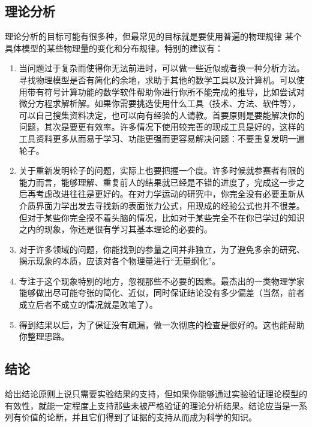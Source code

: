 \documentclass[a4paper,10pt,english]{sphinxmanual}
\begin{document}
\subsection{理论分析}
\label{\detokenize{6. Research:id8}}
理论分析的目标可能有很多种，但最常见的目标就是要使用普遍的物理规律  某个具体模型的某些物理量的变化和分布规律。特别的建议有：
\begin{enumerate}
\item {} 
当问题过于复杂而使得你无法前进时，可以做一些近似或者换一种分析方法。寻找物理模型是否有简化的余地，求助于其他的数学工具以及计算机。可以使用带有符号计算功能的数学软件帮助你进行你所不能完成的推导，比如尝试对微分方程求解析解。如果你需要挑选使用什么工具（技术、方法、软件等），可以自己搜集资料决定，也可以向有经验的人请教。首要原则是要能解决你的问题，其次是要更有效率。许多情况下使用较完善的现成工具是好的，这样的工具资料更多从而易于学习、功能更强而更容易解决问题：不要重复发明一遍轮子。

\item {} 
关于重新发明轮子的问题，实际上也要把握一个度。许多时候就参赛者有限的能力而言，能够理解、重复前人的结果就已经是不错的进度了，完成这一步之后再考虑改进往往是更好的。在对力学运动的研究中，你完全没有必要重新从介质界面力学出发去寻找新的表面张力公式，用现成的经验公式也并不很差。但对于某些你完全摸不着头脑的情况，比如对于某些完全不在你已学过的知识之内的现象，你还是很有学习其基本理论的必要的。

\item {} 
对于许多领域的问题，你能找到的参量之间并非独立，为了避免多余的研究、揭示现象的本质，应该对各个物理量进行“无量纲化”。

\item {} 
专注于这个现象特别的地方，忽视那些不必要的因素。最杰出的一类物理学家能够做出尽可能夸张的简化、近似，同时保证结论没有多少偏差（当然，前者成立后者不成立的情况就是败笔了）。

\item {} 
得到结果以后，为了保证没有疏漏，做一次彻底的检查是很好的。这也能帮助你整理思路。

\end{enumerate}


\subsection{结论}
\label{\detokenize{6. Research:id9}}
给出结论原则上说只需要实验结果的支持，但如果你能够通过实验验证理论模型的有效性，就能一定程度上支持那些未被严格验证的理论分析结果。结论应当是一系列有价值的论断，并且它们得到了证据的支持从而成为科学的知识。
\end{document}
